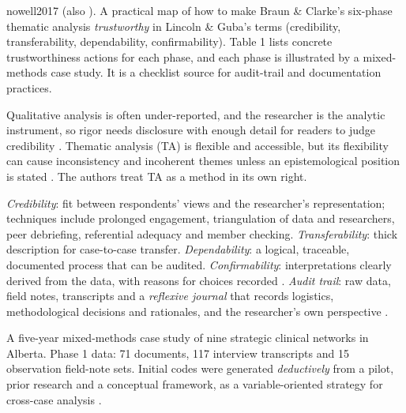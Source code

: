 \begin{papercard}{nowell2017}
  (also  ). A practical map of how to make Braun \& Clarke's six-phase thematic analysis \emph{trustworthy} in Lincoln \& Guba's terms (credibility, transferability, dependability, confirmability). Table 1 lists concrete trustworthiness actions for each phase, and each phase is illustrated by a mixed-methods case study. It is a checklist source for audit-trail and documentation practices.

 Qualitative analysis is often under-reported, and the researcher is the analytic instrument, so rigor needs disclosure with enough detail for readers to judge credibility . Thematic analysis (TA) is flexible and accessible, but its flexibility can cause inconsistency and incoherent themes unless an epistemological position is stated . The authors treat TA as a method in its own right.

 \emph{Credibility}: fit between respondents' views and the researcher's representation; techniques include prolonged engagement, triangulation of data and researchers, peer debriefing, referential adequacy and member checking. \emph{Transferability}: thick description for case-to-case transfer. \emph{Dependability}: a logical, traceable, documented process that can be audited. \emph{Confirmability}: interpretations clearly derived from the data, with reasons for choices recorded . \emph{Audit trail}: raw data, field notes, transcripts and a \emph{reflexive journal} that records logistics, methodological decisions and rationales, and the researcher's own perspective .

 A five-year mixed-methods case study of nine strategic clinical networks in Alberta. Phase 1 data: 71 documents, 117 interview transcripts and 15 observation field-note sets. Initial codes were generated \emph{deductively} from a pilot, prior research and a conceptual framework, as a variable-oriented strategy for cross-case analysis .


\end{papercard}
